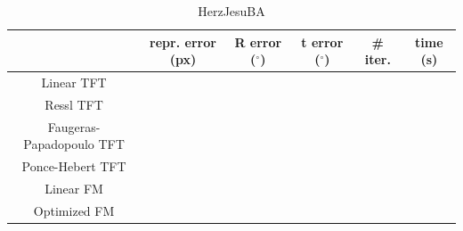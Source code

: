 \begin{table}[htbp]
  \centering
  \caption{HerzJesuBA}
  \label{tab:HerzJesuBA}
  \begin{tabular}{|*{6}{c}|}
    \hline
     & repr. error (px) & R error ($^{\circ}$) & t error ($^{\circ}$) & \# iter. & time (s)\\
    \hline
    Linear TFT & & & & & \\
    \hline
    Ressl TFT & & & & & \\
    \hline
    Faugeras-Papadopoulo TFT & & & & & \\
    \hline
    Ponce-Hebert TFT & & & & & \\
    \hline
    Linear FM & & & & & \\
    \hline
    Optimized FM & & & & & \\
    \hline
  \end{tabular}
\end{table}
